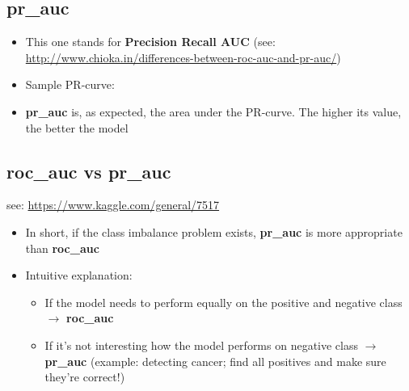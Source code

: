 \documentclass[12pt,a4paper]{article}
\begin{document}
\subsection{pr\_auc}
\begin{itemize}
\item This one stands for \textbf{Precision Recall AUC} (see: \url{http://www.chioka.in/differences-between-roc-auc-and-pr-auc/})
\item Sample PR-curve: 
\item \textbf{pr\_auc} is, as expected, the area under the PR-curve. The higher its value, the better the model 
\end{itemize}
\subsection{roc\_auc vs pr\_auc}
see: \url{https://www.kaggle.com/general/7517}
\begin{itemize}
\item In short, if the class imbalance problem exists, \textbf{pr\_auc} is more appropriate than \textbf{roc\_auc}
\item Intuitive explanation: 
\begin{itemize}
\item If the model needs to perform equally on the positive and negative class $\rightarrow$ \textbf{roc\_auc}
\item If it's not interesting how the model performs on negative class $\rightarrow$ \textbf{pr\_auc} (example: detecting cancer; find all positives and make sure they're correct!)
\end{itemize}
\end{itemize}
\end{document}
